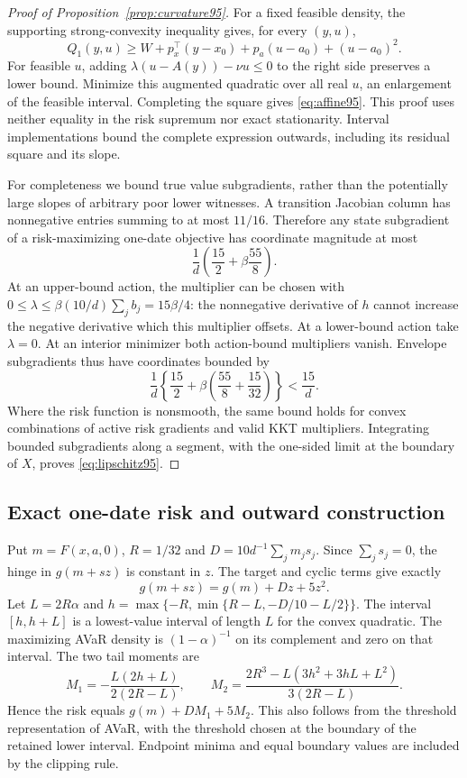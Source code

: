 \begin{proof}[Proof of Proposition~\ref{prop:curvature95}]
For a fixed feasible density, the supporting strong-convexity inequality gives, for every $(y,u)$,
\[
 Q_1(y,u)\geq W+p_x^\top(y-x_0)+p_a(u-a_0)+(u-a_0)^2.
\]
For feasible $u$, adding $\lambda(u-A(y))-\nu u\leq0$ to the right side preserves a lower bound. Minimize this augmented quadratic over all real $u$, an enlargement of the feasible interval. Completing the square gives \eqref{eq:affine95}. This proof uses neither equality in the risk supremum nor exact stationarity. Interval implementations bound the complete expression outwards, including its residual square and its slope.

For completeness we bound true value subgradients, rather than the potentially large slopes of arbitrary poor lower witnesses. A transition Jacobian column has nonnegative entries summing to at most $11/16$. Therefore any state subgradient of a risk-maximizing one-date objective has coordinate magnitude at most
\[
 \frac1d\left(\frac{15}{2}+\beta\frac{55}{8}\right).
\]
At an upper-bound action, the multiplier can be chosen with
$0\leq\lambda\leq\beta(10/d)\sum_j b_j=15\beta/4$:
the nonnegative derivative of $h$ cannot increase the negative derivative which this multiplier offsets. At a lower-bound action take $\lambda=0$. At an interior minimizer both action-bound multipliers vanish. Envelope subgradients thus have coordinates bounded by
\[
 \frac1d\left\{\frac{15}{2}+\beta\left(\frac{55}{8}+\frac{15}{32}\right)\right\}<\frac{15}{d}.
\]
Where the risk function is nonsmooth, the same bound holds for convex combinations of active risk gradients and valid KKT multipliers. Integrating bounded subgradients along a segment, with the one-sided limit at the boundary of $X$, proves \eqref{eq:lipschitz95}.
\end{proof}

\subsection{Exact one-date risk and outward construction}
Put $m=F(x,a,0)$, $R=1/32$ and $D=10d^{-1}\sum_jm_js_j$. Since $\sum_js_j=0$, the hinge in $g(m+sz)$ is constant in $z$. The target and cyclic terms give exactly
\begin{equation}\label{eq:terminalpoly95}
 g(m+sz)=g(m)+Dz+5z^2.
\end{equation}
Let $L=2R\alpha$ and
$h=\max\{-R,\min\{R-L,-D/10-L/2\}\}$.
The interval $[h,h+L]$ is a lowest-value interval of length $L$ for the convex quadratic. The maximizing AVaR density is $(1-\alpha)^{-1}$ on its complement and zero on that interval. The two tail moments are
\[
 M_1=-\frac{L(2h+L)}{2(2R-L)},\qquad
 M_2=\frac{2R^3-L(3h^2+3hL+L^2)}{3(2R-L)}.
\]
Hence the risk equals $g(m)+DM_1+5M_2$. This also follows from the threshold representation of AVaR, with the threshold chosen at the boundary of the retained lower interval. Endpoint minima and equal boundary values are included by the clipping rule.

